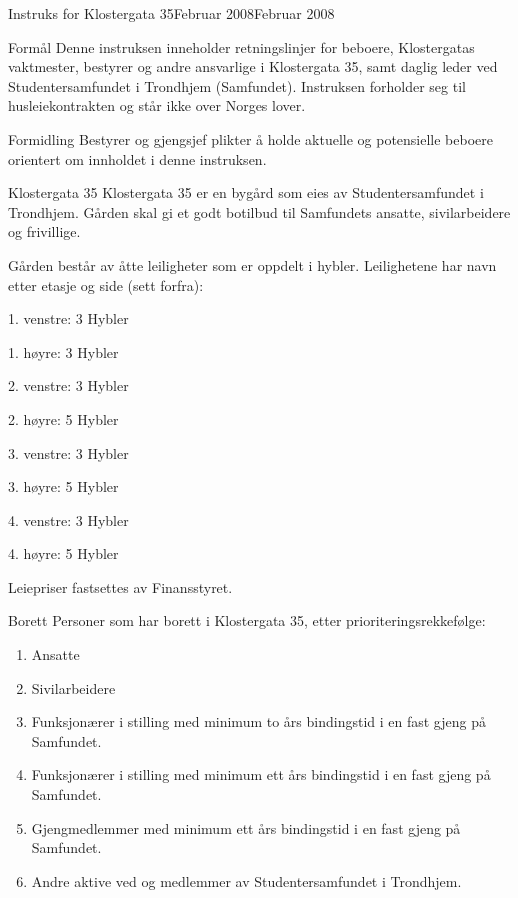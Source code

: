 \begin{instruks}{Instruks for Klostergata 35}{Februar 2008}{Februar 2008}

    \begin{instruksledd}{Formål}
        Denne instruksen inneholder retningslinjer for beboere, Klostergatas vaktmester,
        bestyrer og andre ansvarlige
        i Klostergata 35, samt daglig leder ved Studentersamfundet i Trondhjem
        (Samfundet). Instruksen forholder seg til
        husleiekontrakten og står ikke over Norges lover.
    \end{instruksledd}
    
    \begin{instruksledd}{Formidling}
        Bestyrer og gjengsjef plikter å holde aktuelle og potensielle beboere orientert om
        innholdet i denne
        instruksen.
    \end{instruksledd}

    \begin{instruksledd}{Klostergata 35}
        Klostergata 35 er en bygård som eies av Studentersamfundet i Trondhjem. Gården
        skal gi et godt botilbud til
        Samfundets ansatte, sivilarbeidere og frivillige.
        
        Gården består av åtte leiligheter som er oppdelt i hybler. Leilighetene har navn
        etter etasje og side (sett forfra):
        \begin{description}
            \item 1. venstre: 3 Hybler
            \item 1. høyre: 3 Hybler
            \item 2. venstre: 3 Hybler
            \item 2. høyre: 5 Hybler
            \item 3. venstre: 3 Hybler
            \item 3. høyre: 5 Hybler
            \item 4. venstre: 3 Hybler
            \item 4. høyre: 5 Hybler
        \end{description}
        Leiepriser fastsettes av Finansstyret.
    \end{instruksledd}

    \begin{instruksledd}{Borett}
        Personer som har borett i Klostergata 35, etter prioriteringsrekkefølge:
        \begin{enumerate}
            \item Ansatte
            \item Sivilarbeidere
            \item Funksjonærer i stilling med minimum to års bindingstid i en fast gjeng på Samfundet.
            \item Funksjonærer i stilling med minimum ett års bindingstid i en fast gjeng på Samfundet.
            \item Gjengmedlemmer med minimum ett års bindingstid i en fast gjeng på Samfundet.
            \item Andre aktive ved og medlemmer av Studentersamfundet i Trondhjem.
        \end{enumerate}
        

\end{instruksledd}
\end{instruks}
